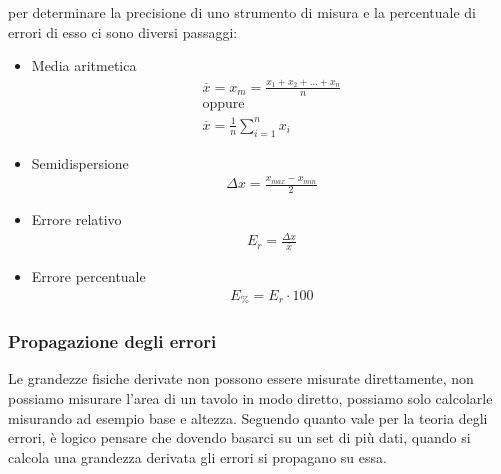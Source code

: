 \documentclass[../main.tex]{subfiles}
\begin{document}
per determinare la precisione di uno strumento di misura e la percentuale di errori di esso ci sono diversi passaggi:
\begin{itemize}
    \item Media aritmetica \begin{align*}
        \overline{x}= x_m = \frac{x_1 + x_2 + \dots + x_n}{n} \\
        \text{oppure} \\
        \overline{x} = \frac{1}{n} \sum_{i=1}^{n} x_i
    \end{align*}
    \item Semidispersione \begin{align*}
        \Delta x = \frac{x_{max}-x_{min}}{2}
    \end{align*}
    \item Errore relativo \begin{align*}
        E_r = \frac{\Delta x}{\overline{x}}
    \end{align*}
    \item Errore percentuale \begin{align*}
        E_\%=E_r\cdot100
    \end{align*}
\end{itemize}

\subsubsection{Propagazione degli errori}
Le grandezze fisiche derivate non possono essere misurate direttamente, non possiamo misurare l'area di un tavolo in modo diretto, possiamo solo calcolarle misurando ad esempio base e altezza. Seguendo quanto vale per la teoria degli errori, è logico pensare che dovendo basarci su un set di più dati, quando si calcola una grandezza derivata gli errori si propagano su essa.
\end{document}
